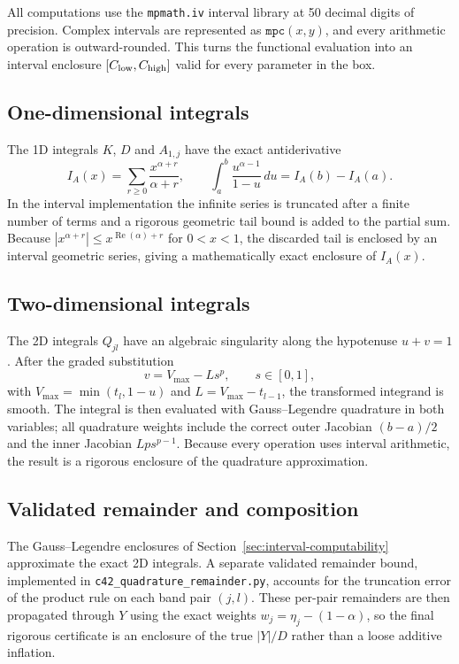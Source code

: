 \documentclass[11pt]{article}
\theoremstyle{plain}
\DeclareMathOperator{\Repart}{Re}
\begin{document}
All computations use the \texttt{mpmath.iv} interval library at 50 decimal digits of precision.  Complex intervals are represented as $\texttt{mpc}(x,y)$, and every arithmetic operation is outward-rounded.  This turns the functional evaluation into an interval enclosure $[C_{\rm low},C_{\rm high}]$ valid for every parameter in the box.

\subsection*{One-dimensional integrals}

The 1D integrals $K$, $D$ and $A_{1,j}$ have the exact antiderivative
\[
I_A(x)=\sum_{r\ge0}\frac{x^{\alpha+r}}{\alpha+r},
\qquad
\int_a^b\frac{u^{\alpha-1}}{1-u}\,du=I_A(b)-I_A(a).
\]
In the interval implementation the infinite series is truncated after a finite number of terms and a rigorous geometric tail bound is added to the partial sum.  Because $|x^{\alpha+r}|\le x^{\Repart(\alpha)+r}$ for $0<x<1$, the discarded tail is enclosed by an interval geometric series, giving a mathematically exact enclosure of $I_A(x)$.

\subsection*{Two-dimensional integrals}

The 2D integrals $Q_{jl}$ have an algebraic singularity along the hypotenuse $u+v=1$.  After the graded substitution
\[
v=V_{\max}-L s^p,\qquad s\in[0,1],
\]
with $V_{\max}=\min(t_l,1-u)$ and $L=V_{\max}-t_{l-1}$, the transformed integrand is smooth.  The integral is then evaluated with Gauss--Legendre quadrature in both variables; all quadrature weights include the correct outer Jacobian $(b-a)/2$ and the inner Jacobian $Lp s^{p-1}$.  Because every operation uses interval arithmetic, the result is a rigorous enclosure of the quadrature approximation.

\subsection*{Validated remainder and composition}

The Gauss--Legendre enclosures of Section~\ref{sec:interval-computability} approximate the exact 2D integrals.  A separate validated remainder bound, implemented in \texttt{c42\_quadrature\_remainder.py}, accounts for the truncation error of the product rule on each band pair $(j,l)$.  These per-pair remainders are then propagated through $Y$ using the exact weights $w_j=\eta_j-(1-\alpha)$, so the final rigorous certificate is an enclosure of the true $|Y|/D$ rather than a loose additive inflation.
\end{document}
